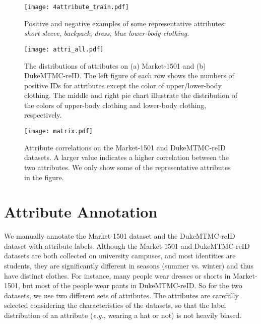 \documentclass[5p,times,twocolumn]{elsarticle}
\begin{document}
\begin{figure}[t]
    \begin{center}
    \texttt{[image: 4attribute\_train.pdf]}
    \end{center}
    \caption{Positive and negative examples of some representative attributes: \emph{short sleeve}, \emph{backpack}, \emph{dress}, \emph{blue lower-body clothing}.}
    \label{fig:4attribute_train}
\end{figure}
    
\begin{figure*}[t]
    \begin{center}
    \texttt{[image: attri\_all.pdf]}
    \end{center}
    \vspace{-5mm}
    \caption{The distributions of attributes on (a) Market-1501 and (b) DukeMTMC-reID. The left figure of each row shows the numbers of positive IDs for attributes except the color of upper/lower-body clothing. The middle and right pie chart illustrate the distribution of the colors of upper-body clothing and lower-body clothing, respectively. }\label{fig:attribute_distribution}
    \end{figure*}

\begin{figure*}[!t]
    \begin{center}
    \texttt{[image: matrix.pdf]}
    \end{center}
    \vspace{-5mm}
    \caption{Attribute correlations on the Market-1501 and DukeMTMC-reID datasets. A larger value indicates a higher correlation between the two attributes. We only show some of the representative attributes in the figure. }\label{fig:attribute_matrix}
\end{figure*} 

\section{Attribute Annotation}
We manually annotate the Market-1501 \cite{Zheng_2015_ICCV} dataset and the DukeMTMC-reID \cite{Zheng_2017_ICCV} dataset with attribute labels. Although the Market-1501 and DukeMTMC-reID datasets are both collected on university campuses, and most identities are students, they are significantly different in seasons (summer vs. winter) and thus have distinct clothes. For instance, many people wear dresses or shorts in Market-1501, but most of the people wear pants in DukeMTMC-reID. So for the two datasets, we use two different sets of attributes. The attributes are carefully selected considering the characteristics of the datasets, so that the label distribution of an attribute (\emph{e.g.}, wearing a hat or not) is not heavily biased. 
    
\end{document}
